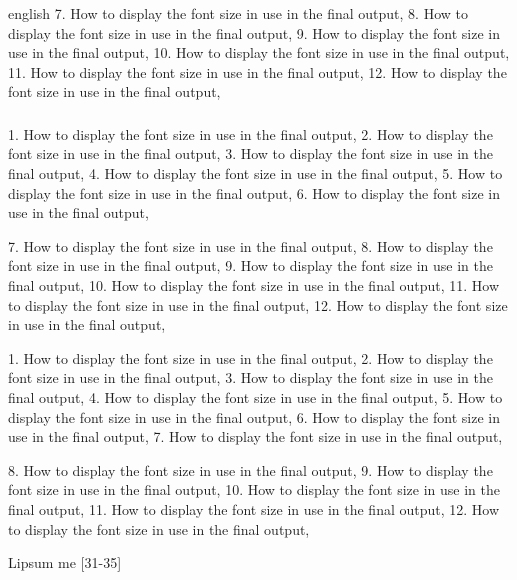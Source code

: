 \begin{otherlanguage*}{english}
7. How to display the font size in use in the final output,
8. How to display the font size in use in the final output,
9. How to display the font size in use in the final output,
10. How to display the font size in use in the final output,
11. How to display the font size in use in the final output,
12. How to display the font size in use in the final output,

\subsubsection{ }

1. How to display the font size in use in the final output,
2. How to display the font size in use in the final output,
3. How to display the font size in use in the final output,
4. How to display the font size in use in the final output,
5. How to display the font size in use in the final output,
6. How to display the font size in use in the final output,

7. How to display the font size in use in the final output,
8. How to display the font size in use in the final output,
9. How to display the font size in use in the final output,
10. How to display the font size in use in the final output,
11. How to display the font size in use in the final output,
12. How to display the font size in use in the final output,

\subsubsubsection{ }

1. How to display the font size in use in the final output,
2. How to display the font size in use in the final output,
3. How to display the font size in use in the final output,
4. How to display the font size in use in the final output,
5. How to display the font size in use in the final output,
6. How to display the font size in use in the final output,
7. How to display the font size in use in the final output,

8. How to display the font size in use in the final output,
9. How to display the font size in use in the final output,
10. How to display the font size in use in the final output,
11. How to display the font size in use in the final output,
12. How to display the font size in use in the final output,


Lipsum me [31-35]

\end{otherlanguage*}


